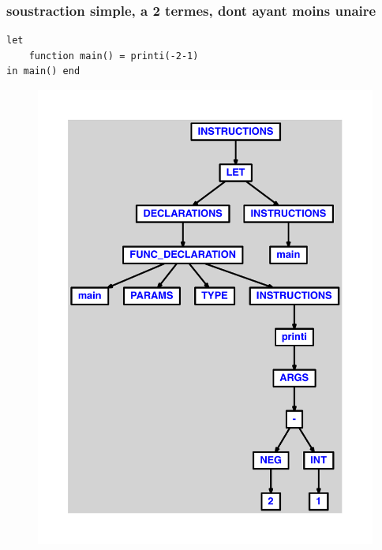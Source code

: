 \documentclass{article}
\begin{document}
\subsubsection{soustraction simple, a 2 termes, dont ayant moins unaire}
\begin{lstlisting}
let
	function main() = printi(-2-1)
in main() end
\end{lstlisting}
\newpage
\begin{figure}[H]
\centering
\includegraphics[max width=\textwidth]{ast/ast_64.pdf}
\end{figure}
\newpage
\end{document}
